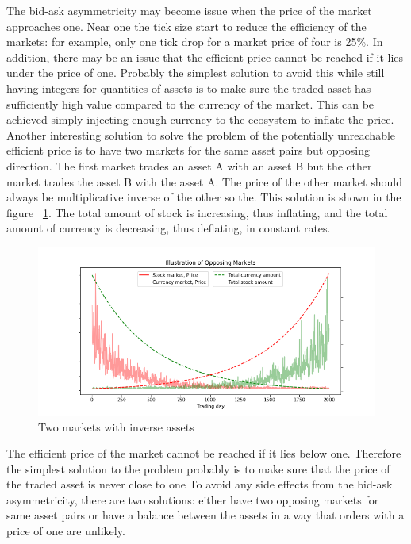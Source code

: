 The bid-ask asymmetricity may become issue when the price of the market
approaches one. Near one the tick size start to reduce the efficiency
of the markets: for example, only one tick drop for a market price 
of four is 25\%. In addition, there may be an issue that the efficient
price cannot be reached if it lies under the price of one. Probably
the simplest solution to avoid this while still having integers for quantities 
of assets is to make sure the traded asset has sufficiently high value
compared to the currency of the market. This can be achieved simply injecting
enough currency to the ecosystem to inflate the price. Another interesting 
solution to solve the problem of the potentially unreachable efficient price 
is to have two markets for the same asset pairs but opposing direction. 
The first market trades an asset A with an asset B but the 
other market trades the asset B with the asset A. The price of the other market
should always be multiplicative inverse of the other so the.
This solution is shown in the figure ~\ref{fig:opposing_markets}. The total
amount of stock is increasing, thus inflating, and the total amount of
currency is decreasing, thus deflating, in constant rates.

\begin{figure}
    \includegraphics[width=\linewidth]{plots/opposing_markets.png}
    \caption{Two markets with inverse assets}
    \label{fig:opposing_markets}
\end{figure}


The efficient price of the market cannot be reached if it
lies below one. Therefore the simplest solution to the problem probably
is to make sure that the price of the traded asset is never close to one
To avoid any side effects from the bid-ask asymmetricity, there are two solutions:
either have two opposing markets for same asset pairs or have a balance between the 
assets in a way that orders with a price of one are unlikely. 

